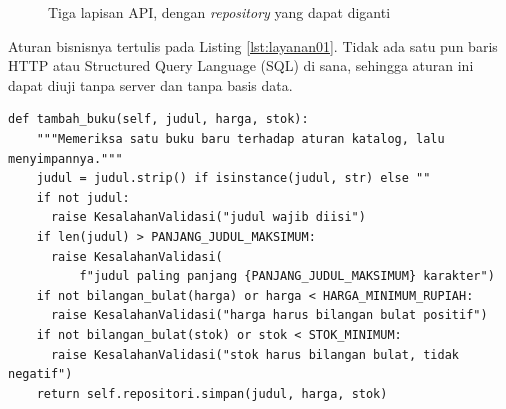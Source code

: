 \begin{figure}[!htb]
  \centering
  \caption{Tiga lapisan API, dengan \textit{repository} yang dapat diganti}
  \label{fig:lapisan01}
\end{figure}

Aturan bisnisnya tertulis pada Listing \ref{lst:layanan01}. Tidak ada satu
pun baris HTTP atau Structured Query Language (SQL) di sana, sehingga aturan ini dapat diuji tanpa server
dan tanpa basis data.

\begin{lstlisting}[style=PythonStyle, caption={Aturan buku yang sah di lapisan \textit{service}, tersedia di \berkas{sources/chapter01/layanan.py}}, label={lst:layanan01}]
  def tambah_buku(self, judul, harga, stok):
    """Memeriksa satu buku baru terhadap aturan katalog, lalu menyimpannya."""
    judul = judul.strip() if isinstance(judul, str) else ""
    if not judul:
      raise KesalahanValidasi("judul wajib diisi")
    if len(judul) > PANJANG_JUDUL_MAKSIMUM:
      raise KesalahanValidasi(
          f"judul paling panjang {PANJANG_JUDUL_MAKSIMUM} karakter")
    if not bilangan_bulat(harga) or harga < HARGA_MINIMUM_RUPIAH:
      raise KesalahanValidasi("harga harus bilangan bulat positif")
    if not bilangan_bulat(stok) or stok < STOK_MINIMUM:
      raise KesalahanValidasi("stok harus bilangan bulat, tidak negatif")
    return self.repositori.simpan(judul, harga, stok)
\end{lstlisting}

